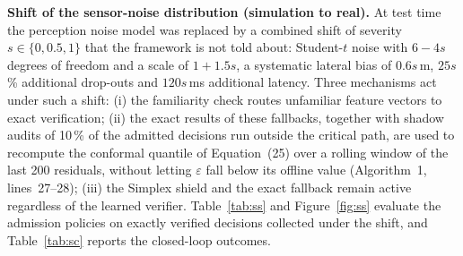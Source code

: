 \documentclass[11pt]{article}
\begin{document}
\textbf{Shift of the sensor-noise distribution (simulation to real).} At test time the perception noise model was replaced by a combined shift of
severity $s\in\{0,0.5,1\}$ that the framework is not told about: Student-$t$ noise with $6-4s$ degrees of freedom and a scale of $1+1.5s$, a
systematic lateral bias of $0.6s$\,m, $25s$\,\% additional drop-outs and $120s$\,ms additional latency. Three mechanisms act under such a shift:
(i) the familiarity check routes unfamiliar feature vectors to exact verification; (ii) the exact results of these fallbacks, together with
shadow audits of 10\,\% of the admitted decisions run outside the critical path, are used to recompute the conformal quantile of Equation~(25)
over a rolling window of the last 200 residuals, without letting $\varepsilon$ fall below its offline value (Algorithm~1, lines~27--28);
(iii) the Simplex shield and the exact fallback remain active regardless of the learned verifier. Table~\ref{tab:ss} and Figure~\ref{fig:ss}
evaluate the admission policies on exactly verified decisions collected under the shift, and Table~\ref{tab:sc} reports the closed-loop outcomes.
\end{document}
